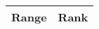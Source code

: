 \documentclass{standalone}
\begin{document}
\begin{table}[h]
    \centering
    \begin{tabular}{|c|c|}
        \hline
        Range & Rank \\
        \hline
    \end{tabular}
\end{table}
\end{document}
